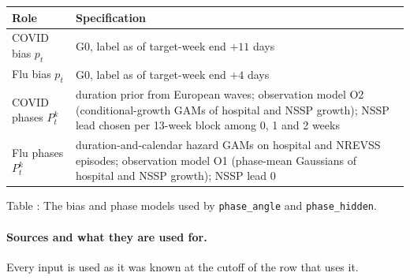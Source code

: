 \documentclass[11pt,a4paper]{article}
\theoremstyle{definition}
\theoremstyle{remark}
\begin{document}
\begin{center}
\small
\begin{tabularx}{\linewidth}{@{}lX@{}}
\toprule
Role & Specification\\
\midrule
COVID bias $p_t$ & G0, label as of target-week end $+11$ days\\
Flu bias $p_t$ & G0, label as of target-week end $+4$ days\\
COVID phases $P_t^k$ & duration prior from European waves; observation
model O2 (conditional-growth GAMs of hospital and NSSP growth); NSSP lead
chosen per 13-week block among 0, 1 and 2 weeks\\
Flu phases $P_t^k$ & duration-and-calendar hazard GAMs on hospital and
NREVSS episodes; observation model O1 (phase-mean Gaussians of hospital
and NSSP growth); NSSP lead 0\\
\bottomrule
\end{tabularx}
\end{center}
\label{tab:phase-specifications}
\begin{center}\small Table \thetable: The bias and phase models used by
\texttt{phase\_angle} and \texttt{phase\_hidden}.
\end{center}

\paragraph{Sources and what they are used for.}
Every input is used as it was known at the cutoff of the row that uses it.
\end{document}
